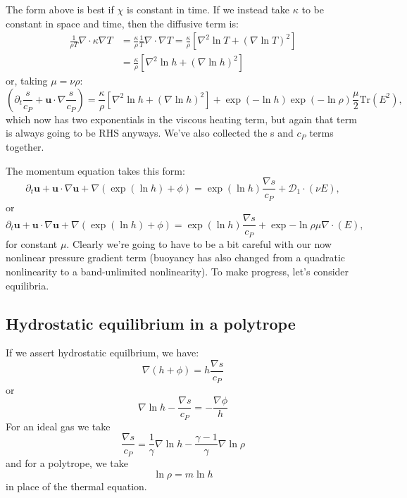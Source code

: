 \documentclass{aastex62}
\newcommand{\del}{\nabla}
\renewcommand{\vec}{\boldsymbol}
\newcommand{\scrD}{\mathcal{D}}
\begin{document}
The form above is best if $\chi$ is constant in time.  If we instead take $\kappa$ to be constant in space and time, then the diffusive term is:
\begin{align}
  \frac{1}{\rho T}\del\cdot\kappa \del T &= \frac{\kappa}{\rho}\frac{1}{T}\del\cdot\del T = \frac{\kappa}{\rho}\left[\nabla^2 \ln T + \left(\nabla \ln T\right)^2\right] \\
  &=
  \frac{\kappa}{\rho}\left[\nabla^2 \ln h + \left(\nabla \ln h\right)^2\right]
\end{align}
or, taking $\mu = \nu \rho$:
\begin{equation}
  \left(\partial_t \frac{s}{c_P} + \vec{u}\cdot \del \frac{s}{c_P}\right) = \frac{\kappa}{\rho}\left[\nabla^2 \ln h + \left(\nabla \ln h\right)^2\right] + \exp{(-\ln h)}\exp{(-\ln \rho)}\frac{\mu}{2}\mathrm{Tr}(E^2),
\end{equation}
which now has two exponentials in the viscous heating term, but again that term is always going to be RHS anyways.  We've also collected the s and $c_P$ terms together.

The momentum equation takes this form:
\begin{equation}
  \partial_t \vec{u} + \vec{u}\cdot \del\vec{u} + \del (\exp{(\ln h)} + \phi) = \exp{(\ln h)}\frac{\del s}{c_P} + \vec{\scrD}_1\cdot(\nu E),
\end{equation}
or
\begin{equation}
  \partial_t \vec{u} + \vec{u}\cdot \del\vec{u} + \del (\exp{(\ln h)} + \phi) = \exp{(\ln h)}\frac{\del s}{c_P} + \exp{-\ln\rho}\mu \del\cdot(E),
\end{equation}
for constant $\mu$.
Clearly we're going to have to be a bit careful with our now nonlinear pressure gradient term (buoyancy has also changed from a quadratic nonlinearity to a band-unlimited nonlinearity).  To make progress, let's consider equilibria.

\subsection{Hydrostatic equilibrium in a polytrope}
If we assert hydrostatic equilbrium, we have:
\begin{equation}
  \del (h + \phi) = h\frac{\del s}{c_P}
\end{equation}
or
\begin{equation}
  \del \ln h  - \frac{\del s}{c_P} = - \frac{\del \phi}{h}
\end{equation}
For an ideal gas we take
\begin{equation}
  \frac{\del s}{c_P} = \frac{1}{\gamma}\del \ln h - \frac{\gamma-1}{\gamma}\del \ln \rho
\end{equation}
and for a polytrope, we take
\begin{equation}
  \ln \rho = m \ln h
\end{equation}
in place of the thermal equation.
\end{document}
